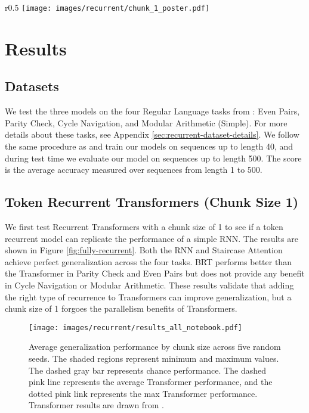     \begin{wrapfigure}[15]{r}{0.5\linewidth}
        \centering
        \vspace{-6em}
        \texttt{[image: images/recurrent/chunk\_1\_poster.pdf]}
        \caption{Average generalization performance of token recurrent architectures (chunk size 1) on Regular Language tasks. Bars indicate minimum and maximum values across five random seeds.}
        \label{fig:fully-recurrent}
    \end{wrapfigure}
    
    \section{Results}
    \subsection{Datasets}
    We test the three models on the four Regular Language tasks from \citet{deletang_neural_2022}: Even Pairs, Parity Check, Cycle Navigation, and Modular Arithmetic (Simple). For more details about these tasks, see Appendix \ref{sec:recurrent-dataset-details}. We follow the same procedure as \citet{deletang_neural_2022} and train our models on sequences up to length 40, and during test time we evaluate our model on sequences up to length 500. The score is the average accuracy measured over sequences from length 1 to 500.
    
    \subsection{Token Recurrent Transformers (Chunk Size 1)}
    We first test Recurrent Transformers with a chunk size of 1 to see if a token recurrent model can replicate the performance of a simple RNN. The results are shown in Figure \ref{fig:fully-recurrent}. Both the RNN and Staircase Attention achieve perfect generalization across the four tasks. BRT performs better than the Transformer in Parity Check and Even Pairs but does not provide any benefit in Cycle Navigation or Modular Arithmetic. These results validate that adding the right type of recurrence to Transformers can improve generalization, but a chunk size of 1 forgoes the parallelism benefits of Transformers.
    
    \begin{figure}
        \centering
        \texttt{[image: images/recurrent/results\_all\_notebook.pdf]}
        \caption{Average generalization performance by chunk size across five random seeds. The shaded regions represent minimum and maximum values. The dashed gray bar represents chance performance. The dashed pink line represents the average Transformer performance, and the dotted pink link represents the max Transformer performance. Transformer results are drawn from \citet{deletang_neural_2022}.}
        \label{fig:results}
    \end{figure}
    
